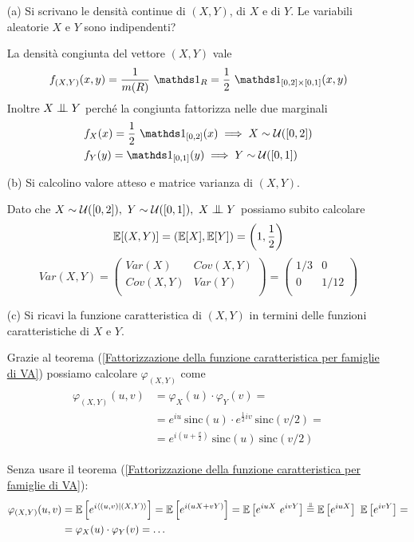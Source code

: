 \Soluzione{} %
\begin{itemize}
\item [(a)] Si scrivano le densità continue di $(X,Y)$, di $X$ e di $Y$. Le variabili aleatorie $X$ e $Y$ sono indipendenti?

La densità congiunta del vettore $(X,Y)$ vale
\[
\fXYxy=\frac{1}{m(R)}\ \Ind_R=\frac{1}{2}\ \Ind_{[0,2]\times [0,1]}(x,y)
\]
Inoltre $X\indep Y$ perché la congiunta fattorizza nelle due marginali
\begin{gather*}
\begin{aligned}
&f_X(x)=\frac{1}{2}\ \Ind_{[0,2]}(x)\implies X\sim\Uc([0,2])\\
&f_Y(y)=\Ind_{[0,1]}(y)\implies Y\sim\Uc([0,1])
\end{aligned}
\end{gather*}

\item [(b)] Si calcolino valore atteso e matrice varianza di $(X,Y)$.

Dato che $X\sim\Uc([0,2]),\ Y\sim\Uc([0,1]),\ X\indep Y$ possiamo subito calcolare
\[
\mathbb{E}[(X,Y)]=\left(\mathbb{E}[X],\mathbb{E}[Y]\right)=\left(1,\frac{1}{2}\right)
\]
\[
Var(X,Y)=\begin{pmatrix}
Var(X) & Cov(X,Y) \\
Cov(X,Y) & Var(Y) \\
\end{pmatrix}=\begin{pmatrix}
1/3 & 0 \\
0 & 1/12 \\
\end{pmatrix}
\]

\item [(c)] Si ricavi la funzione caratteristica di $(X,Y)$ in termini delle funzioni caratteristiche di $X$ e $Y$.

Grazie al teorema (\ref{Fattorizzazione della funzione caratteristica per famiglie di VA}) possiamo calcolare $\varphi_{(X,Y)}$ come
\begin{gather*}
\begin{aligned}
\varphi_{(X,Y)}(u,v)&=\varphi_X(u)\cdot \varphi_Y(v)=\\
&=e^{iu}\ \text{sinc}(u)\cdot e^{\frac{1}{2}iv}\ \text{sinc}\left(v/2\right)=\\
&=e^{i\left(u+\frac{v}{2}  \right)}\ \text{sinc}(u)\ \text{sinc}\left(v/2\right)
\end{aligned}
\end{gather*}

\begin{oss}
Senza usare il teorema (\ref{Fattorizzazione della funzione caratteristica per famiglie di VA}):
\begin{gather*}
\begin{aligned}
\varphi_{(X,Y)}(u,v)&=\EE\left[e^{i\langle(u,v)|(X,Y)  \rangle}   \right]=\EE\left[e^{i(uX+vY)}   \right]=\EE\left[e^{iuX}\ e^{ivY}   \right]\overset{\underset{\indep}{}}{=}\EE\left[e^{iuX}\right]\ \EE\left[e^{ivY}\right]=\\
&=\varphi_X(u)\cdot \varphi_Y(v)=\dots
\end{aligned}
\end{gather*}
\end{oss}


\end{itemize}
